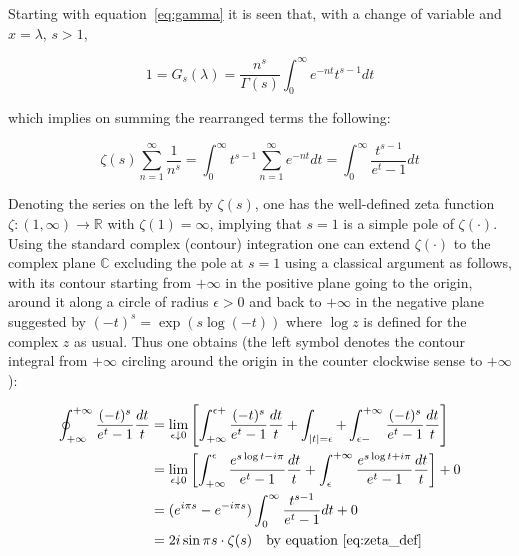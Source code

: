 \documentclass[11pt]{article}
\begin{document}
Starting with equation~\eqref{eq:gamma} it is seen that, with a change of variable and $x = \lambda$, $s > 1$,

\begin{equation}
\label{eq:zeta_integral}
1 = G_s(\lambda) = \frac{n^s}{\Gamma(s)} \int_0^\infty e^{-nt} t^{s-1} dt
\end{equation}

which implies on summing the rearranged terms the following:

\begin{equation}
\label{eq:zeta_def}
\zeta(s) \sum_{n=1}^\infty \frac{1}{n^s} = \int_0^\infty t^{s-1} \sum_{n=1}^\infty e^{-nt} dt = \int_0^\infty \frac{t^{s-1}}{e^t - 1} dt
\end{equation}

Denoting the series on the left by $\zeta(s)$, one has the well-defined zeta function $\zeta: (1,\infty) \to \mathbb{R}$ with $\zeta(1) = \infty$, implying that $s = 1$ is a simple pole of $\zeta(\cdot)$. Using the standard complex (contour) integration one can extend $\zeta(\cdot)$ to the complex plane $\mathbb{C}$ excluding the pole at $s = 1$ using a classical argument as follows, with its contour starting from $+\infty$ in the positive plane going to the origin, around it along a circle of radius $\epsilon > 0$ and back to $+\infty$ in the negative plane suggested by $(-t)^s = \exp(s \log(-t))$ where $\log z$ is defined for the complex $z$ as usual. Thus one obtains (the left symbol denotes the contour integral from $+\infty$ circling around the origin in the counter clockwise sense to $+\infty$):

\begin{align}
\label{eq:contour}
\oint_{+\infty}^{+\infty} \frac{(-t)^s}{e^t - 1} \frac{dt}{t} &= \lim_{\epsilon \downarrow 0} \left[ \int_{+\infty}^{\epsilon+} \frac{(-t)^s}{e^t - 1} \frac{dt}{t} + \int_{|t|=\epsilon} + \int_{\epsilon-}^{+\infty} \frac{(-t)^s}{e^t - 1} \frac{dt}{t} \right] \\
&= \lim_{\epsilon \downarrow 0} \left[ \int_{+\infty}^{\epsilon} \frac{e^{s \log t - i\pi}}{e^t - 1} \frac{dt}{t} + \int_{\epsilon}^{+\infty} \frac{e^{s \log t + i\pi}}{e^t - 1} \frac{dt}{t} \right] + 0 \nonumber \\
&= (e^{i\pi s} - e^{-i\pi s}) \int_0^\infty \frac{t^{s-1}}{e^t - 1} dt + 0 \nonumber \\
&= 2i \sin \pi s \cdot \zeta(s) \quad \text{by equation~\eqref{eq:zeta_def}} \nonumber
\end{align}
\end{document}
